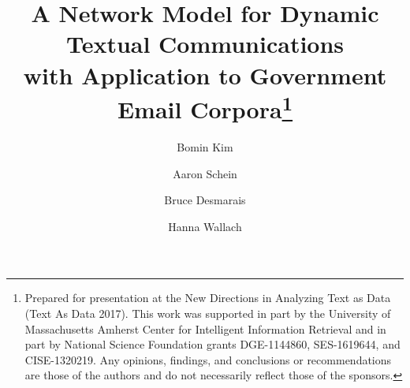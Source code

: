 
\usepackage{geometry}
\usepackage{lipsum}
\usepackage{tabu}
\usepackage[english]{babel}
\usepackage[utf8]{inputenc}
\usepackage[parfill]{parskip}
\usepackage{longtable}
\usepackage{amsmath}
\usepackage{graphicx}
\usepackage{enumitem}
\usepackage[colorinlistoftodos]{todonotes}
\usepackage{tikz}
\newcommand*\circled[1]{\tikz[baseline=(char.base)]{
		\node[shape=circle,draw,inner sep=0.5pt] (char) {#1};}}
\usetikzlibrary{fit,positioning}
\usepackage{authblk}
\usepackage{natbib}
\usepackage[algo2e]{algorithm2e}
\usepackage{algorithmic}  
\usepackage{algorithm}
\usepackage{comment}
\usepackage{bbm}
\usepackage{array}%
\makeatletter
\g@addto@macro{\endtabular}{\rowfont{}}%
\makeatother
\newcommand{\rowfonttype}{}%
\newcommand{\rowfont}[1]{%
	\gdef\rowfonttype{#1}#1%
}
\newcolumntype{L}{>{\rowfonttype}l}
\title{A Network Model for Dynamic Textual Communications \\with Application to
	Government Email Corpora\footnote{\noindent Prepared for presentation at the New Directions in Analyzing Text as Data (Text As Data 2017). This work was supported in part by the University of Massachusetts Amherst Center for Intelligent Information Retrieval and in part by National Science Foundation grants DGE-1144860, SES-1619644, and CISE-1320219. Any opinions, findings, and conclusions or recommendations are those of the authors and do not necessarily reflect those of the sponsors. }}

\author[1]{Bomin Kim}
\author[3]{Aaron Schein}
\author[1]{Bruce Desmarais}
\author[2,3]{Hanna Wallach}


